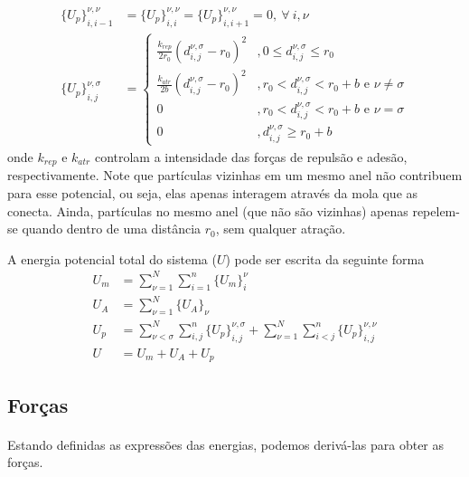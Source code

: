 \documentclass{article}
\theoremstyle{definition}
\def \quantitygsc#1#2#3#4#5{{#1}_{#2, #3}^{#4, #5}}
\def \deslocgsc#1#2#3#4{\quantitygsc{d}{#1}{#2}{#3}{#4}}
\begin{document}
\begin{equation}
\begin{aligned}
{\{U_p\}}_{i, i-1}^{\nu, \nu} &= {\{U_p\}}_{i, i}^{\nu, \nu} = {\{U_p\}}_{i, i+1}^{\nu, \nu} = 0, ~\forall~i, \nu \\
{\{U_p\}}_{i, j}^{\nu, \sigma} &= \begin{cases}
    \frac{k_{rep}}{2r_0}(\deslocgsc{i}{j}{\nu}{\sigma} - r_0)^2 &, 0 \leq \deslocgsc{i}{j}{\nu}{\sigma} \leq r_0 \\
    \frac{k_{atr}}{2b}(\deslocgsc{i}{j}{\nu}{\sigma} - r_0)^2 &, r_0 < \deslocgsc{i}{j}{\nu}{\sigma} < r_0 + b \text{ e } \nu \neq \sigma \\
    0 &, r_0 < \deslocgsc{i}{j}{\nu}{\sigma} < r_0 + b \text{ e } \nu = \sigma \\
    0 &, \deslocgsc{i}{j}{\nu}{\sigma} \geq r_0 + b 
\end{cases}
\end{aligned}
\label{eq:particle_particle_pot}
\end{equation}
onde $k_{rep}$ e $k_{atr}$ controlam a intensidade das forças de repulsão e adesão, respectivamente. Note que partículas vizinhas em um mesmo anel não contribuem para esse potencial, ou seja, elas apenas interagem através da mola que as conecta. Ainda, partículas no mesmo anel (que não são vizinhas) apenas repelem-se quando dentro de uma distância $r_0$, sem qualquer atração. 

A energia potencial total do sistema ($U$) pode ser escrita da seguinte forma
\begin{equation}
\begin{aligned}
    U_m &= \sum_{\nu=1}^N\sum_{i=1}^{n} {\{U_m\}}_i^\nu \\
    U_A &= \sum_{\nu=1}^N {\{U_A\}}_\nu \\
    U_p &= \sum_{\nu < \sigma}^N \sum_{i, j}^n {\{U_p\}}_{i, j}^{\nu,   \sigma}  + \sum_{\nu=1}^N\sum_{i < j}^n {\{U_p\}}_{i, j}^{\nu, \nu}\\
    U & = U_m + U_A + U_p
\end{aligned}
\label{eq:total_energy}
\end{equation}

\subsection{Forças}
\paragraph{}
Estando definidas as expressões das energias, podemos derivá-las para obter as forças.
\end{document}
